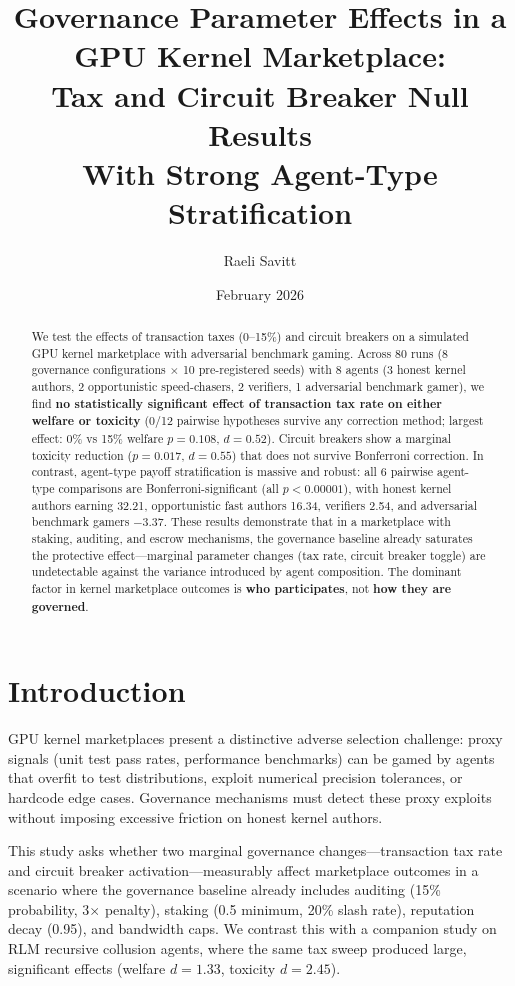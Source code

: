 \documentclass[11pt]{article}
\title{Governance Parameter Effects in a GPU Kernel Marketplace:\\Tax and Circuit Breaker Null Results\\With Strong Agent-Type Stratification}
\author{Raeli Savitt}
\date{February 2026}
\begin{document}
\maketitle

\begin{abstract}
We test the effects of transaction taxes (0--15\%) and circuit breakers on a simulated GPU kernel marketplace with adversarial benchmark gaming. Across 80 runs (8 governance configurations $\times$ 10 pre-registered seeds) with 8 agents (3 honest kernel authors, 2 opportunistic speed-chasers, 2 verifiers, 1 adversarial benchmark gamer), we find \textbf{no statistically significant effect of transaction tax rate on either welfare or toxicity} (0/12 pairwise hypotheses survive any correction method; largest effect: 0\% vs 15\% welfare $p = 0.108$, $d = 0.52$). Circuit breakers show a marginal toxicity reduction ($p = 0.017$, $d = 0.55$) that does not survive Bonferroni correction. In contrast, agent-type payoff stratification is massive and robust: all 6 pairwise agent-type comparisons are Bonferroni-significant (all $p < 0.00001$), with honest kernel authors earning 32.21, opportunistic fast authors 16.34, verifiers 2.54, and adversarial benchmark gamers $-3.37$. These results demonstrate that in a marketplace with staking, auditing, and escrow mechanisms, the governance baseline already saturates the protective effect---marginal parameter changes (tax rate, circuit breaker toggle) are undetectable against the variance introduced by agent composition. The dominant factor in kernel marketplace outcomes is \textbf{who participates}, not \textbf{how they are governed}.
\end{abstract}

\section{Introduction}

GPU kernel marketplaces present a distinctive adverse selection challenge: proxy signals (unit test pass rates, performance benchmarks) can be gamed by agents that overfit to test distributions, exploit numerical precision tolerances, or hardcode edge cases. Governance mechanisms must detect these proxy exploits without imposing excessive friction on honest kernel authors.

This study asks whether two marginal governance changes---transaction tax rate and circuit breaker activation---measurably affect marketplace outcomes in a scenario where the governance baseline already includes auditing (15\% probability, 3$\times$ penalty), staking (0.5 minimum, 20\% slash rate), reputation decay (0.95), and bandwidth caps. We contrast this with a companion study on RLM recursive collusion agents, where the same tax sweep produced large, significant effects (welfare $d = 1.33$, toxicity $d = 2.45$).
\end{document}
